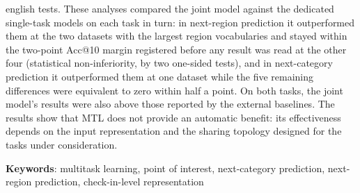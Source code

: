 \begin{resumo}[Abstract]
\begin{otherlanguage*}{english}
            tests. These analyses compared the joint model against the
            dedicated single-task models on each task in turn: in next-region
            prediction it outperformed them at the two datasets with the largest region
            vocabularies and stayed within the two-point Acc@10 margin registered before
            any result was read at the other four (statistical non-inferiority, by two one-sided tests), and in next-category prediction it
            outperformed them at one dataset while the five remaining differences were
            equivalent to zero within half a point. On both tasks, the joint
            model's results were also above those reported by the external baselines.
            The results
            show that MTL does not
            provide an automatic benefit: its effectiveness depends on the input
            representation and the sharing topology designed for the tasks under
            consideration.

            \vspace{\onelineskip}
            \noindent
            \begin{minipage}{\linewidth}
                \textbf{Keywords}:
                multitask learning, point of interest, next-category prediction,
                next-region prediction, check-in-level representation
            \end{minipage}
        \end{otherlanguage*}
    \end{resumo}
    \else
    \pagestyle{empty}
    \fi

    \listoffigures*
    \cleardoublepage

